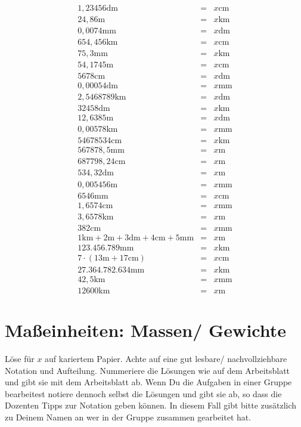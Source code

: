 \documentclass[a4paper]{book}%
\newcommand{\anweisungArbeitsblatt}{Löse für $x$ auf kariertem Papier. Achte auf eine gut lesbare/ nachvollziehbare Notation und Aufteilung. Nummeriere die Lösungen wie auf dem Arbeitsblatt und gibt sie mit dem Arbeitsblatt ab. Wenn Du die Aufgaben in einer Gruppe bearbeitest notiere dennoch selbst die Lösungen und gibt sie ab, so dass die Dozenten Tipps zur Notation geben können. In diesem Fall gibt bitte zusätzlich zu Deinem Namen an wer in der Gruppe zusammen gearbeitet hat.}
\theoremstyle{definition}
\begin{document}
\begin{eqnarray}
  1,23456\text{dm} &=& x \text{cm}\\
  24,86\text{m} &=& x \text{km}\\
  0,0074\text{mm} &=& x \text{dm}\\
  654,456\text{km} &=& x \text{cm}\\
  75,3\text{mm} &=& x \text{km}\\
  54,1745\text{m} &=& x \text{cm}\\
  5678\text{cm} &=& x \text{dm}\\
  0,00054\text{dm} &=& x \text{mm}\\
  2,5468789\text{km} &=& x \text{dm}\\
  32458\text{dm} &=& x \text{km}\\
  12,6385\text{m} &=& x \text{dm}\\
  0,00578\text{km} &=& x \text{mm}\\
  54678534\text{cm} &=& x \text{km}\\
  567878,5\text{mm} &=& x \text{m}\\
  687798,24\text{cm} &=& x \text{m}\\
  534,32\text{dm} &=& x \text{m}\\
  0,005456\text{m} &=& x \text{mm}\\
  6546\text{mm} &=& x \text{cm}\\
  1,6574\text{cm} &=& x \text{mm}\\
  3,6578\text{km} &=& x \text{m}\\
  382\text{cm} &=& x \text{mm}\\
  1\text{km} + 2\text{m} +3\text{dm} +4\text{cm} +5\text{mm} &=& x \text{m} \\
  123.456.789\text{mm} &=& x \text{km} \\
  7 \cdot (13\text{m} + 17\text{cm}) &=& x\text{cm} \\
  27.364.782.634\text{mm} &=& x \text{km}\\
  42,5\text{km} &=& x \text{mm}\\
  12600\text{km} &=& x \text{m}
\end{eqnarray}



\newpage
\section{Maßeinheiten: Massen/ Gewichte}

\anweisungArbeitsblatt
\end{document}
